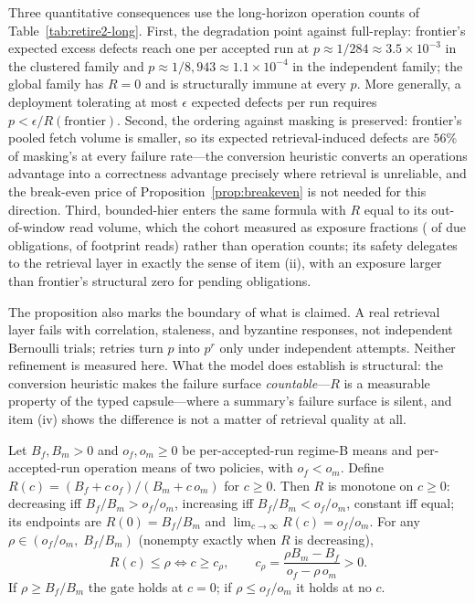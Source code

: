Three quantitative consequences use the long-horizon operation counts
of Table~\ref{tab:retire2-long}. First, the degradation point against
full-replay: frontier's expected excess defects reach one per accepted
run at $p\approx1/284\approx3.5\times10^{-3}$ in the clustered family
and $p\approx1/8{,}943\approx1.1\times10^{-4}$ in the independent
family; the global family has $R=0$ and is structurally immune at
every $p$. More generally, a deployment tolerating at most $\epsilon$
expected defects per run requires $p<\epsilon/R(\text{frontier})$.
Second, the ordering against masking is preserved: frontier's pooled
fetch volume is \RetwoOpsReduction{} smaller, so its expected
retrieval-induced defects are $56\%$ of masking's at every failure
rate---the conversion heuristic converts an operations advantage into a
correctness advantage precisely where retrieval is unreliable, and the
break-even price of Proposition~\ref{prop:breakeven} is not needed for
this direction. Third, bounded-hier enters the same formula with
$R$ equal to its out-of-window read volume, which the cohort measured
as exposure fractions (\ExpBhDueExposed{} of due obligations,
\ExpBhFootprintExposed{} of footprint reads) rather than operation
counts; its safety delegates to the retrieval layer in exactly the
sense of item (ii), with an exposure larger than frontier's
structural zero for pending obligations.

The proposition also marks the boundary of what is claimed. A real
retrieval layer fails with correlation, staleness, and byzantine
responses, not independent Bernoulli trials; retries turn $p$ into
$p^{r}$ only under independent attempts. Neither refinement is
measured here. What the model does establish is structural: the
conversion heuristic makes the failure surface \emph{countable}---$R$ is a
measurable property of the typed capsule---where a summary's failure
surface is silent, and item (iv) shows the difference is not a matter
of retrieval quality at all.

\begin{proposition}\label{prop:breakeven}
Let $B_f,B_m>0$ and $o_f,o_m\ge 0$ be per-accepted-run regime-B means
and per-accepted-run operation means of two policies, with
$o_f<o_m$. Define $R(c)=(B_f+c\,o_f)/(B_m+c\,o_m)$ for $c\ge 0$. Then
$R$ is monotone on $c\ge0$: decreasing iff $B_f/B_m>o_f/o_m$,
increasing iff $B_f/B_m<o_f/o_m$, constant iff equal; its endpoints
are $R(0)=B_f/B_m$ and $\lim_{c\to\infty}R(c)=o_f/o_m$. For any
$\rho\in(o_f/o_m,\;B_f/B_m)$ (nonempty exactly when $R$ is
decreasing),
\begin{equation}
R(c)\le\rho\iff c\ge c_\rho,\qquad
c_\rho=\frac{\rho B_m-B_f}{o_f-\rho\,o_m}>0.
\end{equation}
If $\rho\ge B_f/B_m$ the gate holds at $c=0$; if $\rho\le o_f/o_m$ it
holds at no $c$.
\end{proposition}

